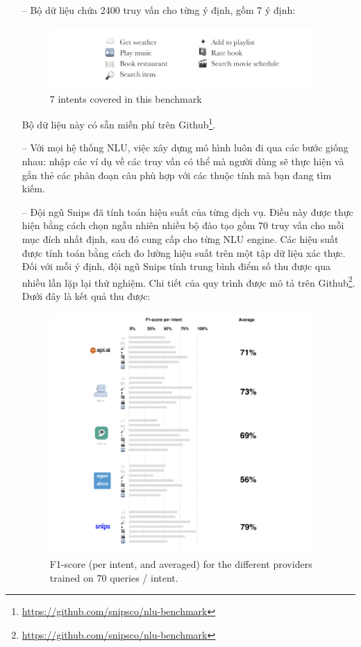\begin{itemize}
        \item[--]Bộ dữ liệu chứa 2400 truy vấn cho từng ý định, gồm 7 ý định:

        \begin{figure}[htp]
            \centering
            \includegraphics[width=10cm]{images/ComparisonOfNLU/7ntents.png}
            \caption{7 intents covered in this benchmark}
            \label{fig:system-class-intent}
        \end{figure}
        Bộ dữ liệu này có sẵn miễn phí trên Github\footnote{\url{https://github.com/snipsco/nlu-benchmark}}.
        \item[--]Với mọi hệ thống NLU, việc xây dựng mô hình luôn đi qua các bước giống nhau: nhập các ví dụ về các truy vấn có thể mà người dùng sẽ thực hiện và gắn thẻ các phân đoạn câu phù hợp với các thuộc tính mà bạn đang tìm kiếm.

        \item[--]Đội ngũ Snips đã tính toán hiệu suất của từng dịch vụ. Điều này được thực hiện bằng cách chọn ngẫu nhiên nhiều bộ đào tạo gồm 70 truy vấn cho mỗi mục đích nhất định, sau đó cung cấp cho từng NLU engine. Các hiệu suất được tính toán bằng cách đo lường hiệu suất trên một tập dữ liệu xác thực. Đối với mỗi ý định, đội ngũ Snips tính trung bình điểm số thu được qua nhiều lần lặp lại thử nghiệm. Chi tiết của quy trình được mô tả trên Github\footnote{\url{https://github.com/snipsco/nlu-benchmark}}. Dưới đây là kết quả thu được:

        \begin{figure}[htp]
            \centering
            \includegraphics[width=10cm]{images/ComparisonOfNLU/f1Score70Intents.png}
            \caption{F1-score (per intent, and averaged) for the different providers trained on 70 queries / intent.}
            \label{fig:system-class-intent}
        \end{figure}


\end{itemize}
